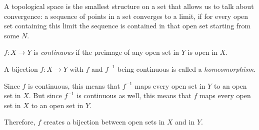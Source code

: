 A topological space is the smallest structure on a set that allows us to talk about
convergence: a sequence of points in a set converges to a limit, if
for every open set containing this limit the sequence is contained
in that open set starting from some $N$.

\begin{definition}
    $f : X \to Y$ is \textit{continuous} if the preimage of any open set in $Y$
    is open in $X$.
\end{definition}
\begin{definition}
    A bijection $f : X \to Y$ with $f$ and $f^{-1}$ being continuous is called a
    \textit{homeomorphism}.
\end{definition}
\begin{remark}
    Since $f$ is continuous,
    this means that $f^{-1}$ maps every open set in $Y$ to an open set in $X$.
    But since $f^{-1}$ is continuous as well, this means that 
    $f$ maps every open set in $X$ to an open set in $Y$.

    Therefore, $f$ creates a bijection between open sets in $X$ and in $Y$.
\end{remark}

